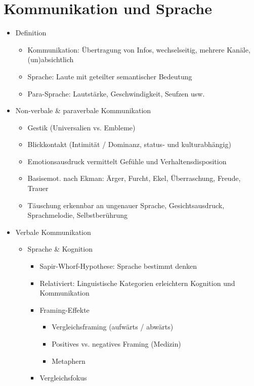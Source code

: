 \documentclass[11pt, paper=a4, twocolumn]{scrartcl}
\begin{document}
	\section{Kommunikation und Sprache}
		\begin{itemize}
			\item Definition
				\begin{itemize}
					\item Kommunikation: Übertragung von Infos, wechselseitig, mehrere Kanäle, (un)absichtlich
					\item Sprache: Laute mit geteilter semantischer Bedeutung
					\item Para-Sprache: Lautstärke, Geschwindigkeit, Seufzen usw.
				\end{itemize}
			\item Non-verbale \& paraverbale Kommunikation
				\begin{itemize}
					\item Gestik (Universalien vs. Embleme)
					\item Blickkontakt (Intimität / Dominanz, status- und kulturabhängig)
					\item Emotionsausdruck vermittelt Gefühle und Verhaltensdisposition
					\item Basisemot. nach Ekman: Ärger, Furcht, Ekel, Überraschung, Freude, Trauer
					\item Täuschung erkennbar an ungenauer Sprache, Gesichtsausdruck, Sprachmelodie, Selbstberührung
				\end{itemize}
			\item Verbale Kommunikation
				\begin{itemize}
					\item Sprache \& Kognition
						\begin{itemize}
							\item Sapir-Whorf-Hypothese: Sprache bestimmt denken
							\item Relativiert: Linguistische Kategorien erleichtern Kognition und Kommunikation
							\item Framing-Effekte
								\begin{itemize}
									\item Vergleichsframing (aufwärts / abwärts)
									\item Positives vs. negatives Framing (Medizin)
									\item Metaphern
								\end{itemize}
							\item Vergleichsfokus
								\begin{itemize}

\end{itemize}
\end{itemize}
\end{itemize}
\end{itemize}
\end{document}
